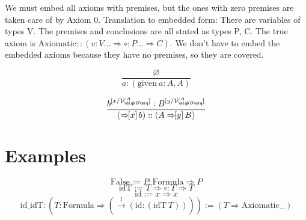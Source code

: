 \documentclass{article}
\newcommand{\usage}{\mathcal{V}}
\newcommand{\usageKnown}[2]{{\usage_{\mlq\hspace{-0.06em}#2\hspace{-0.06em}\mrq}^{:#1}}}
\newcommand{\subst}[3]{#1^{[{#2}{/}{#3}]}}
\newcommand{\hole}{\circ}
\newcommand{\hastype}[2]{#1 : #2}
\newcommand{\hastypemeta}[2]{#1 :: #2}
\newcommand{\namemappinguntyped}[2]{#1 \Rightarrow #2}
\newcommand{\namemappingtype}[3]{#1:#2 \Rightarrow #3}
\newcommand{\treemappinguntyped}[2]{\Rightarrow\hspace{-0.4em}[#1]\,#2}
\newcommand{\treemappingtype}[3]{#1 \treemappinguntyped{#2}{#3}}
\newcommand{\unfoldsin}[1]{\overset{#1}{\rightarrow}}
\newcommand{\assuming}[3]{\mathrm{given}\ #1:#2, #3}
\begin{document}
  We must embed all axioms with premises, but the ones with zero premises are taken care of by Axiom 0. Translation to embedded form: There are variables of types V. The premises and conclusions are all stated as types P, C. The true axiom is $\hastypemeta{\mathrm{Axiomatic}}{(\namemappingtype{v}{V\dots}{\namemappingtype{\hole}{P\dots}{C}})}$. We don't have to embed the embedded axioms because they have no premises, so they are covered.


  \[ \frac{
\varnothing
  }{
    \hastype{a}{(\assuming{a}{A}{A})}
  } \]

  \[ \frac{
    \hastype{\subst{b}{x}{\usageKnown{A}{bB}}}{\subst{B}{y}{\usageKnown{A}{bB}}}
  }{
    \hastypemeta{
      (\treemappinguntyped{x} b)
    }{
      (\treemappingtype{A}{y}{B})
    }
  } \]



  \section{Examples}\label{structure}
  \[
    \mathrm{False} := \namemappingtype{P}{\mathrm{Formula}}{P}
  \]
  \[
    \mathrm{idT} := \namemappinguntyped{T}{\namemappingtype{\hole}{T}{T}}
  \]
  \[
    \mathrm{id} := \namemappinguntyped{x}{x}
  \]
  \[
    \mathrm{id\_idT} : (\namemappingtype{T}{\mathrm{Formula}}{(\unfoldsin{l}{(\hastype{\mathrm{id}}{(\mathrm{idT}\ T)})})}) := (\namemappinguntyped{T}{\mathrm{Axiomatic \_ \_}})
  \]

\end{document}
